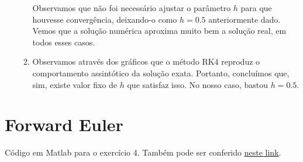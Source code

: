 \documentclass{article}
\begin{document}
\begin{enumerate}
\begin{enumerate}
                        Observamos que não foi necessário ajustar o parâmetro
                        $h$ para que houvesse convergência, deixando-o como
                        $h = 0.5$ anteriormente dado. Vemos que a solução
                        numérica aproxima muito bem a solução real, em todos
                        esses casos.

                    \item Observamos através dos gráficos que o método RK4 reproduz
                        o comportamento assintótico da solução exata. Portanto,
                        concluímos que, sim, existe valor fixo de $h$ que satisfaz
                        isso. No nosso caso, bastou $h = 0.5$.
                \end{enumerate} 
    \end{enumerate}

    \clearpage

    \appendix

    \section{Forward Euler}
        \label{appendix:forward_euler}

        Código em Matlab para o exercício 4. Também pode ser conferido
        \href{https://github.com/lucasresck/introduction-to-numerical-analysis/blob/master/list_4/forward_euler_4.m}{neste link}.
\end{document}
